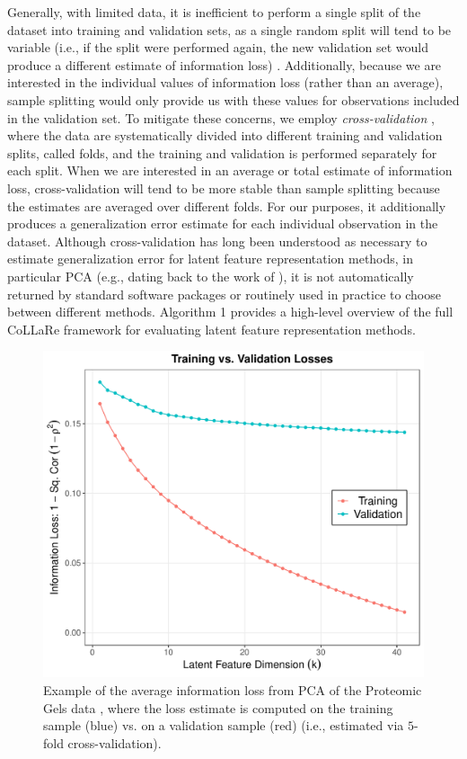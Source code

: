 Generally, with limited data, it is inefficient to perform a single split of the dataset into training and validation sets, as a single random split will tend to be variable (i.e., if the split were performed again, the new validation set would produce a different estimate of information loss) \parencite[Table 1]{collins_evaluation_2024}.
Additionally, because we are interested in the individual values of information loss (rather than an average), sample splitting would only provide us with these values for observations included in the validation set. 
To mitigate these concerns, we employ \emph{cross-validation} \parencite{stone_cross-validatory_1974}, where the data are systematically divided into different training and validation splits, called folds, and the training and validation is performed separately for each split.
When we are interested in an average or total estimate of information loss, cross-validation will tend to be more stable than sample splitting because the estimates are averaged over different folds.
For our purposes, it additionally produces a generalization error estimate for each individual observation in the dataset.
Although cross-validation has long been understood as necessary to estimate generalization error for latent feature representation methods, in particular PCA (e.g., dating back to the work of \textcite{wold_cross-validatory_1978, eastment_cross-validatory_1982, krzanowski_cross-validation_1987}), it is not automatically returned by standard software packages or routinely used in practice to choose between different methods.
Algorithm 1 provides a high-level overview of the full CoLLaRe framework for evaluating latent feature representation methods.





\begin{figure}
    \centering
    \includegraphics[width=0.5\linewidth]{figures/training-validation.pdf}
    \caption{Example of the average information loss from PCA of the Proteomic Gels data \parencite{morris_pinnacle_2008}, where the loss estimate is computed on the training sample (blue) vs. on a validation sample (red) (i.e., estimated via $5$-fold cross-validation).}
    \label{fig:training-validation}
\end{figure}

